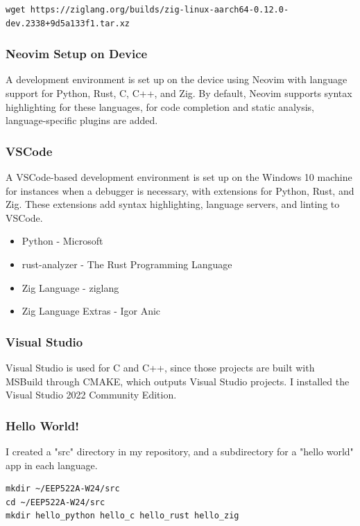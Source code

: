 \documentclass[12pt]{article}
\begin{document}
\begin{lstlisting}
wget https://ziglang.org/builds/zig-linux-aarch64-0.12.0-dev.2338+9d5a133f1.tar.xz 
\end{lstlisting}

\subsubsection{Neovim Setup on Device}
A development environment is set up on the device using Neovim with language support for Python, Rust, C, C++, and Zig. By default, Neovim supports syntax highlighting for these languages, for code completion and static analysis, language-specific plugins are added. 

\subsubsection{VSCode} A VSCode-based development environment is set up on the Windows 10 machine for instances when a debugger is necessary, with extensions for Python, Rust, and Zig. These extensions add syntax highlighting, language servers, and linting to VSCode.
\begin{itemize}
\item Python - Microsoft
\item rust-analyzer - The Rust Programming Language
\item Zig Language - ziglang
\item Zig Language Extras - Igor Anic
\end{itemize}

\subsubsection{Visual Studio}
Visual Studio is used for C and C++, since those projects are built with MSBuild through CMAKE, which outputs Visual Studio projects. I installed the Visual Studio 2022 Community Edition.

\subsubsection{Hello World!}
I created a "src" directory in my repository, and a subdirectory for a "hello world" app in each language.

\begin{lstlisting}
mkdir ~/EEP522A-W24/src 
cd ~/EEP522A-W24/src
mkdir hello_python hello_c hello_rust hello_zig
\end{lstlisting}
\end{document}
